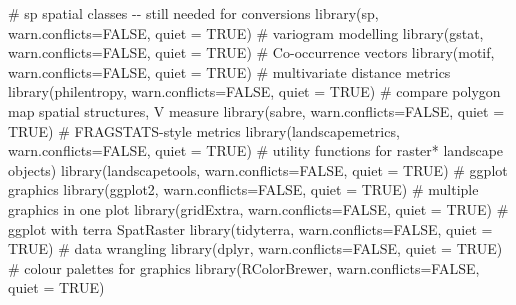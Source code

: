 \documentclass[
  letterpaper,
  DIV=11,
  numbers=noendperiod]{scrartcl}
\newenvironment{Shaded}{\begin{snugshade}}{\end{snugshade}}
\newcommand{\AttributeTok}[1]{\textcolor[rgb]{0.40,0.45,0.13}{#1}}
\newcommand{\CommentTok}[1]{\textcolor[rgb]{0.37,0.37,0.37}{#1}}
\newcommand{\ConstantTok}[1]{\textcolor[rgb]{0.56,0.35,0.01}{#1}}
\newcommand{\FunctionTok}[1]{\textcolor[rgb]{0.28,0.35,0.67}{#1}}
\newcommand{\NormalTok}[1]{\textcolor[rgb]{0.00,0.23,0.31}{#1}}
\begin{document}
\begin{Shaded}
\begin{Highlighting}[]
\CommentTok{\# \textasciigrave{}sp\textasciigrave{} spatial classes {-}{-} still needed for conversions}
\FunctionTok{library}\NormalTok{(sp, }\AttributeTok{warn.conflicts=}\ConstantTok{FALSE}\NormalTok{, }\AttributeTok{quiet =} \ConstantTok{TRUE}\NormalTok{)}
\CommentTok{\# variogram modelling}
\FunctionTok{library}\NormalTok{(gstat, }\AttributeTok{warn.conflicts=}\ConstantTok{FALSE}\NormalTok{, }\AttributeTok{quiet =} \ConstantTok{TRUE}\NormalTok{)}
\CommentTok{\# Co{-}occurrence vectors}
\FunctionTok{library}\NormalTok{(motif, }\AttributeTok{warn.conflicts=}\ConstantTok{FALSE}\NormalTok{, }\AttributeTok{quiet =} \ConstantTok{TRUE}\NormalTok{) }
\CommentTok{\# multivariate distance metrics}
\FunctionTok{library}\NormalTok{(philentropy, }\AttributeTok{warn.conflicts=}\ConstantTok{FALSE}\NormalTok{, }\AttributeTok{quiet =} \ConstantTok{TRUE}\NormalTok{) }
\CommentTok{\# compare polygon map spatial structures, V measure}
\FunctionTok{library}\NormalTok{(sabre, }\AttributeTok{warn.conflicts=}\ConstantTok{FALSE}\NormalTok{, }\AttributeTok{quiet =} \ConstantTok{TRUE}\NormalTok{)   }
\CommentTok{\# FRAGSTATS{-}style metrics}
\FunctionTok{library}\NormalTok{(landscapemetrics, }\AttributeTok{warn.conflicts=}\ConstantTok{FALSE}\NormalTok{, }\AttributeTok{quiet =} \ConstantTok{TRUE}\NormalTok{) }
\CommentTok{\# utility functions for raster* landscape objects)}
\FunctionTok{library}\NormalTok{(landscapetools, }\AttributeTok{warn.conflicts=}\ConstantTok{FALSE}\NormalTok{, }\AttributeTok{quiet =} \ConstantTok{TRUE}\NormalTok{)}
\CommentTok{\# ggplot graphics}
\FunctionTok{library}\NormalTok{(ggplot2, }\AttributeTok{warn.conflicts=}\ConstantTok{FALSE}\NormalTok{, }\AttributeTok{quiet =} \ConstantTok{TRUE}\NormalTok{)}
\CommentTok{\# multiple graphics in one plot}
\FunctionTok{library}\NormalTok{(gridExtra, }\AttributeTok{warn.conflicts=}\ConstantTok{FALSE}\NormalTok{, }\AttributeTok{quiet =} \ConstantTok{TRUE}\NormalTok{)}
\CommentTok{\# ggplot with terra SpatRaster}
\FunctionTok{library}\NormalTok{(tidyterra, }\AttributeTok{warn.conflicts=}\ConstantTok{FALSE}\NormalTok{, }\AttributeTok{quiet =} \ConstantTok{TRUE}\NormalTok{)}
\CommentTok{\# data wrangling}
\FunctionTok{library}\NormalTok{(dplyr, }\AttributeTok{warn.conflicts=}\ConstantTok{FALSE}\NormalTok{, }\AttributeTok{quiet =} \ConstantTok{TRUE}\NormalTok{)}
\CommentTok{\# colour palettes for graphics}
\FunctionTok{library}\NormalTok{(RColorBrewer, }\AttributeTok{warn.conflicts=}\ConstantTok{FALSE}\NormalTok{, }\AttributeTok{quiet =} \ConstantTok{TRUE}\NormalTok{)}

\end{Highlighting}
\end{Shaded}
\end{document}
